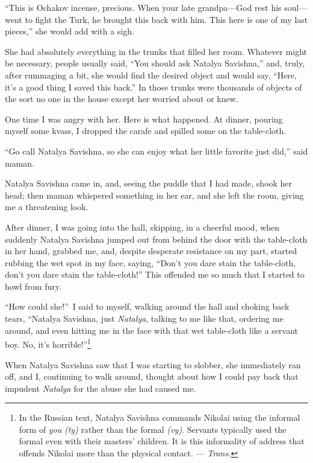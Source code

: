 ``This is Ochakov incense, precious. When your late grandpa---God rest his soul---went to fight the Turk, he brought this back with him. This here is one of my last pieces,'' she would add with a sigh. %

She had absolutely everything in the trunks that filled her room. Whatever might be necessary, people usually said, ``You should ask Natalya Savishna,'' and, truly, after rummaging a bit, she would find the desired object and would say, ``Here, it's a good thing I saved this back.'' In those trunks were thousands of objects of the sort no one in the house except her worried about or knew. %

One time I was angry with her. Here is what happened. At dinner, pouring myself some kvass, I dropped the carafe and spilled some on the table-cloth.

``Go call Natalya Savishna, so she can enjoy what her little favorite just did,'' said maman.

Natalya Savishna came in, and, seeing the puddle that I had made, shook her head; then maman whispered something in her ear, and she left the room, giving me a threatening look.

After dinner, I was going into the hall, skipping, in a cheerful mood, when suddenly Natalya Savishna jumped out from behind the door with the table-cloth in her hand, grabbed me, and, despite desperate resistance on my part, started rubbing the wet spot in my face, saying, ``Don't you dare stain the table-cloth, don't you dare stain the table-cloth!'' This offended me so much that I started to howl from fury. %

``How could she!''~I said to myself, walking around the hall and choking back tears, ``Natalya Savishna, just \emph{Natalya}, talking to me like that, ordering me around, and even hitting me in the face with that wet table-cloth like a servant boy. No, it's horrible!''\footnote{In the Russian text, Natalya Savishna commands Nikolai using the informal form of \textit{you} \textit{(ty)} rather than the formal \textit{(vy)}. Servants typically used the formal even with their masters' children. It is this informality of address that offends Nikolai more than the physical contact. --- \textit{Trans.}}

When Natalya Savishna saw that I was starting to slobber, she immediately ran off, and I, continuing to walk around, thought about how I could pay back that impudent \emph{Natalya} for the abuse she had caused me.

